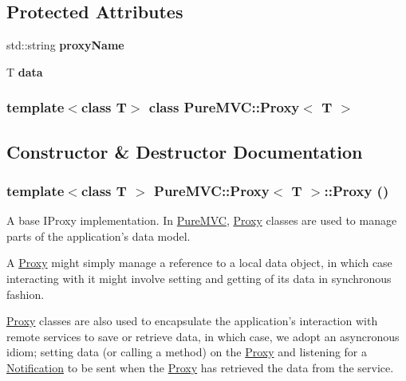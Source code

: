 \subsection*{Protected Attributes}
\begin{DoxyCompactItemize}
\item 
\hypertarget{class_pure_m_v_c_1_1_proxy_a6bf46aa704777b196fc1bd0747ca766e}{
std::string {\bfseries proxyName}}
\label{class_pure_m_v_c_1_1_proxy_a6bf46aa704777b196fc1bd0747ca766e}

\item 
\hypertarget{class_pure_m_v_c_1_1_proxy_ada26175282e6a9607e07c40de63872b8}{
T {\bfseries data}}
\label{class_pure_m_v_c_1_1_proxy_ada26175282e6a9607e07c40de63872b8}

\end{DoxyCompactItemize}
\subsubsection*{template$<$class T$>$ class PureMVC::Proxy$<$ T $>$}



\subsection{Constructor \& Destructor Documentation}
\hypertarget{class_pure_m_v_c_1_1_proxy_ab9b9198b6a4aeec5fa06f8a73c1d96f8}{
\subsubsection[{Proxy}]{\setlength{\rightskip}{0pt plus 5cm}template$<$class T $>$ {\bf PureMVC::Proxy}$<$ T $>$::{\bf Proxy} ()}}
\label{class_pure_m_v_c_1_1_proxy_ab9b9198b6a4aeec5fa06f8a73c1d96f8}


A base {\ttfamily IProxy} implementation. In \hyperlink{namespace_pure_m_v_c}{PureMVC}, {\ttfamily \hyperlink{class_pure_m_v_c_1_1_proxy}{Proxy}} classes are used to manage parts of the application's data model. 

A {\ttfamily \hyperlink{class_pure_m_v_c_1_1_proxy}{Proxy}} might simply manage a reference to a local data object, in which case interacting with it might involve setting and getting of its data in synchronous fashion.

{\ttfamily \hyperlink{class_pure_m_v_c_1_1_proxy}{Proxy}} classes are also used to encapsulate the application's interaction with remote services to save or retrieve data, in which case, we adopt an asyncronous idiom; setting data (or calling a method) on the {\ttfamily \hyperlink{class_pure_m_v_c_1_1_proxy}{Proxy}} and listening for a {\ttfamily \hyperlink{class_pure_m_v_c_1_1_notification}{Notification}} to be sent when the {\ttfamily \hyperlink{class_pure_m_v_c_1_1_proxy}{Proxy}} has retrieved the data from the service. 

